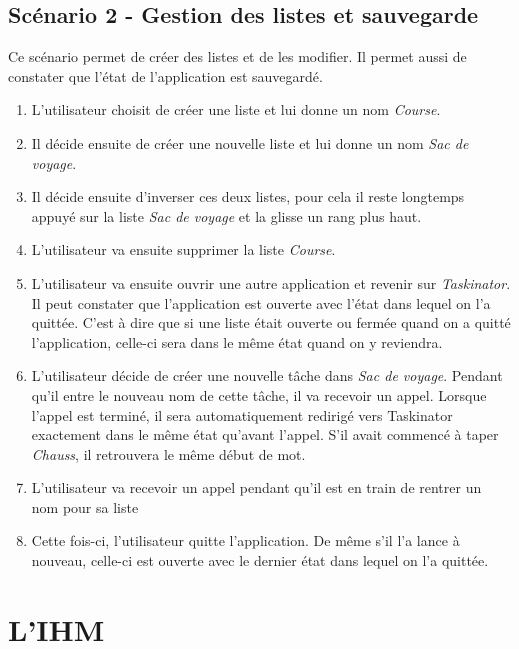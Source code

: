 \documentclass[a4paper,10pt]{article}
\begin{document}
\subsection{Scénario 2 - Gestion des listes et sauvegarde}
Ce scénario permet de créer des listes et de les modifier. Il permet aussi de constater que l'état de l'application est sauvegardé.
\begin{enumerate}
\item{L'utilisateur choisit de créer une liste et lui donne un nom \textit{Course}.}
\item{Il décide ensuite de créer une nouvelle liste et lui donne un nom \textit{Sac de voyage}.}
\item{Il décide ensuite d'inverser ces deux listes, pour cela il reste longtemps appuyé sur la liste \textit{Sac de voyage} et la glisse un rang plus haut.}
\item{L'utilisateur va ensuite supprimer la liste \textit{Course}.}
\item{L'utilisateur va ensuite ouvrir une autre application et revenir sur \textit{Taskinator}. Il peut constater que l'application est ouverte avec l'état dans lequel on l'a quittée. C'est à dire que si une liste était ouverte ou fermée quand on a quitté l'application, celle-ci sera dans le même état quand on y reviendra.}
\item{L'utilisateur décide de créer une nouvelle tâche dans \textit{Sac de voyage}. Pendant qu'il entre le nouveau nom de cette tâche, il va recevoir un appel. Lorsque l'appel est terminé, il sera automatiquement redirigé vers Taskinator exactement dans le même état qu'avant l'appel. S'il avait commencé à taper \textit{Chauss}, il retrouvera le même début de mot.}
\item{L'utilisateur va recevoir un appel pendant qu'il est en train de rentrer un nom pour sa liste}
\item{Cette fois-ci, l'utilisateur quitte l'application. De même s'il l'a lance à nouveau, celle-ci est ouverte avec le dernier état dans lequel on l'a quittée.}
\end{enumerate}


\newpage
\section{L'IHM}
\end{document}
